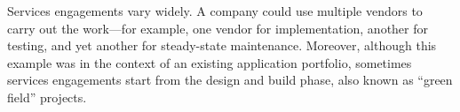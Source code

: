 Services engagements vary widely. A company could use multiple vendors to carry
out the work---for example, one vendor for implementation, another for testing,
and yet another for steady-state maintenance.  Moreover, although this example
was in the context of an existing application portfolio, sometimes services
engagements start from the design and build phase, also known as ``green field''
projects.


%
%
%

